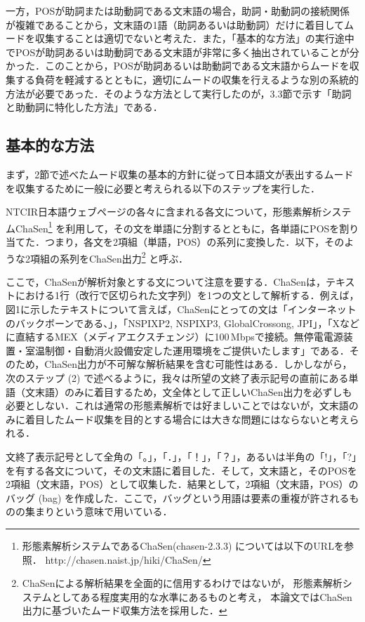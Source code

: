 \documentclass[japanese]{jnlp_1.4}
\newcommand{\InHone}[1]{}
\begin{document}
一方，POSが助詞または助動詞である文末語の場合，助詞・助動詞の接続関係が複雑であることから，文末語の1語（助詞あるいは助動詞）だけに着目してムードを収集することは適切でないと考えた．また，「基本的な方法」の実行途中でPOSが助詞あるいは助動詞である文末語が非常に多く抽出されていることが分かった．このことから，POSが助詞あるいは助動詞である文末語からムードを収集する負荷を軽減するとともに，適切にムードの収集を行えるような別の系統的方法が必要であった．そのような方法として実行したのが，3.3節で示す「助詞と助動詞に特化した方法」である．


\subsection{基本的な方法}

まず，2節で述べたムード収集の基本的方針に従って日本語文が表出するムードを収集するために一般に必要と考えられる以下のステップを実行した．

\InHone{(1)} 
NTCIR日本語ウェブページの各々に含まれる各文について，形態素解析システムChaSen\footnote{
	形態素解析システムであるChaSen(chasen-2.3.3) については以下のURLを参照．\hfill\break
	http://chasen.naist.jp/hiki/ChaSen/}
を利用して，その文を単語に分割するとともに，各単語にPOSを割り当てた．つまり，各文を2項組（単語，POS）の系列に変換した．以下，そのような2項組の系列をChaSen出力\footnote{
	ChaSenによる解析結果を全面的に信用するわけではないが，
	形態素解析システムとしてある程度実用的な水準にあるものと考え，
	本論文ではChaSen出力に基づいたムード収集方法を採用した．}
と呼ぶ．

ここで，ChaSenが解析対象とする文について注意を要する．ChaSenは，テキストにおける1行（改行で区切られた文字列）を1つの文として解析する．例えば，図1に示したテキストについて言えば，ChaSenにとっての文は「インターネットのバックボーンである、」，「NSPIXP2, 
NSPIXP3, GlobalCrossong, 
JPI」，「Xなどに直結するMEX（メディアエクスチェンジ）に100\,Mbpsで接続。無停電電源装置・室温制御・自動消火設備安定した運用環境をご提供いたします」である．そのため，ChaSen出力が不可解な解析結果を含む可能性はある．しかしながら，次のステップ (2) で述べるように，我々は所望の文終了表示記号の直前にある単語（文末語）のみに着目するため，文全体として正しいChaSen出力を必ずしも必要としない．これは通常の形態素解析では好ましいことではないが，文末語のみに着目したムード収集を目的とする場合には大きな問題にはならないと考えられる．

\InHone{(2)}
文終了表示記号として全角の「。」，「．」，「！」，「？」，あるいは半角の「!」，「?」を有する各文について，その文末語に着目した．そして，文末語と，そのPOSを2項組（文末語，POS）として収集した．結果として，2項組（文末語，POS）のバッグ (bag) を作成した．ここで，バッグという用語は要素の重複が許されるものの集まりという意味で用いている．
\end{document}

